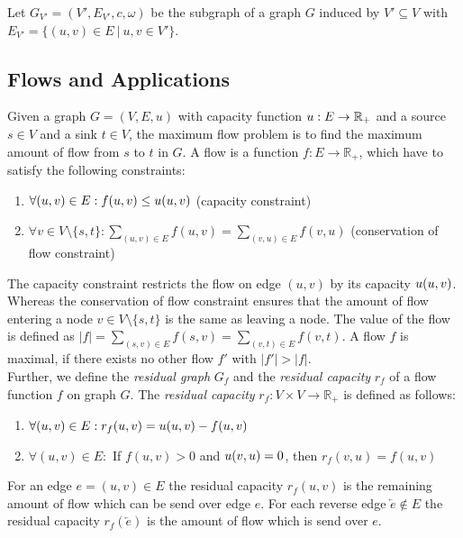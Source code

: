 \begin{definition}
Let $G_{V'} = (V',E_{V'},c,\omega)$ be the subgraph of a graph $G$
induced by $V' \subseteq V$ with $E_{V'} = \{(u,v) \in E\ |\ u,v \in V'\}$.
\label{def:subgraph}
\end{definition}


\subsection{Flows and Applications}
\label{sec:applications}

Given a graph $G = (V,E,u)$ with capacity function $u: E \rightarrow \mathbb{R}_+$ and a source 
$s \in V$ and a sink $t \in V$, the maximum flow problem is to find
the maximum amount of flow from $s$ to $t$ in $G$. A flow is a function 
$f: E \rightarrow \mathbb{R}_+$, which have to satisfy the following constraints:
\begin{enumerate}
\item $\forall (u,v) \in E: f(u,v) \le u(u,v)$ (capacity constraint)
\item $\forall v \in V \setminus \{s,t\}: \sum_{(u,v) \in E} f(u,v) = \sum_{(v,u) \in E} f(v,u)$ (conservation of flow constraint)
\end{enumerate}
The capacity constraint restricts the flow on edge $(u,v)$ by its capacity 
$u(u,v)$. Whereas the conservation of flow constraint ensures that the amount
of flow entering a node $v \in V \setminus \{s,t\}$ is the same as leaving a node.
The value of the flow is defined as $|f| = \sum_{(s,v) \in E} f(s,v) = \sum_{(v,t) \in E} f(v,t)$.
A flow $f$ is maximal, if there exists no other flow $f'$ with $|f'| > |f|$. \\
Further, we define the \emph{residual graph} $G_f$ and the 
\emph{residual capacity} $r_f$ of a flow function $f$ on graph $G$.
The \emph{residual capacity} $r_f: V \times V \rightarrow \mathbb{R}_+$ is defined as follows:
\begin{enumerate}
\item $\forall (u,v) \in E: r_f(u,v) = u(u,v) - f(u,v)$
\item $\forall (u,v) \in E:$ If $f(u,v) > 0$ and $u(v,u) = 0$, then $r_f(v,u) = f(u,v)$
\end{enumerate}
For an edge $e = (u,v) \in E$ the residual capacity $r_f(u,v)$ is the remaining amount of 
flow which can be send over edge $e$. For each reverse edge $\overleftarrow{e} \notin E$ the
residual capacity $r_f(\overleftarrow{e})$ is the amount of flow which is send over $e$.
